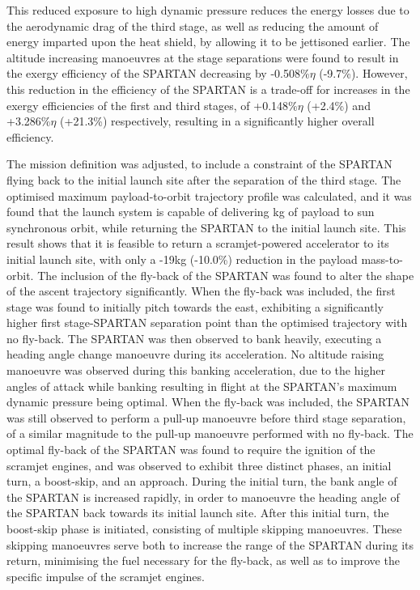 This reduced exposure to high dynamic pressure reduces the energy losses due to the aerodynamic drag of the third stage, as well as reducing the amount of energy imparted upon the heat shield, by allowing it to be jettisoned earlier. 
The altitude increasing manoeuvres at the stage separations were found to result in the exergy efficiency of the SPARTAN decreasing by -0.508\%$\eta$ (-9.7\%). However, this reduction in the efficiency of the SPARTAN is a trade-off for increases in the exergy efficiencies of the first and third stages, of +0.148\%$\eta$ (+2.4\%) and +3.286\%$\eta$ (+21.3\%) respectively, resulting in a significantly higher overall efficiency.


The mission definition was adjusted, to include a constraint of the SPARTAN flying back to the initial launch site after the separation of the third stage. 
The optimised maximum payload-to-orbit trajectory profile was calculated, and it was found that the launch system is capable of delivering \PayloadToOrbitStandard kg of payload to sun synchronous orbit, while returning the SPARTAN to the initial launch site. This result shows that it is feasible to return a scramjet-powered accelerator to its initial launch site, with only a -19kg (-10.0\%) reduction in the payload mass-to-orbit.
	The inclusion of the fly-back of the SPARTAN was found to alter the shape of the ascent trajectory significantly. When the fly-back was included, the first stage was found to initially pitch towards the east, exhibiting a significantly higher first stage-SPARTAN separation point than the optimised trajectory with no fly-back. The SPARTAN was then observed to bank heavily, executing a heading angle change manoeuvre during its acceleration. No altitude raising manoeuvre was observed during this banking acceleration, due to the higher angles of attack while banking resulting in flight at the SPARTAN's maximum dynamic pressure being optimal. 
When the fly-back was included, the SPARTAN was still observed to perform a pull-up manoeuvre before third stage separation, of a similar magnitude to the pull-up manoeuvre performed with no fly-back. 
The optimal fly-back of the SPARTAN was found to require the ignition of the scramjet engines, and was observed to exhibit three distinct phases, an initial turn, a boost-skip, and an approach. 
During the initial turn, the bank angle of the SPARTAN is increased rapidly, in order to manoeuvre the heading angle of the SPARTAN back towards its initial launch site. 
After this initial turn, the boost-skip phase is initiated, consisting of multiple skipping manoeuvres. These skipping manoeuvres serve both to increase the range of the SPARTAN during its return, minimising the fuel necessary for the fly-back, as well as to improve the specific impulse of the scramjet engines.
